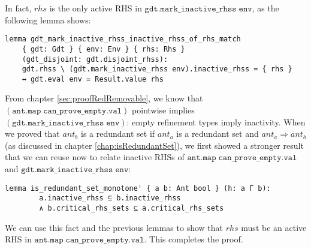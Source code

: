 In fact, $\mathit{rhs}$ is the only active RHS in $\mathtt{gdt.mark\_inactive\_rhss\;env}$, as the following lemma shows:

\begin{verbatim}
lemma gdt_mark_inactive_rhss_inactive_rhss_of_rhs_match
    { gdt: Gdt } { env: Env } { rhs: Rhs }
    (gdt_disjoint: gdt.disjoint_rhss):
    gdt.rhss \ (gdt.mark_inactive_rhss env).inactive_rhss = { rhs }
    ↔ gdt.eval env = Result.value rhs
\end{verbatim}

From chapter \ref{sec:proofRedRemovable}, we know that $(\mathtt{ant.map\;can\_prove\_empty.val})$ pointwise implies $(\mathtt{gdt.mark\_inactive\_rhss\;env})$:
empty refinement types imply inactivity.
When we proved that $\mathit{ant}_b$ is a redundant set if $\mathit{ant}_a$ is a redundant set and $\mathit{ant}_a \Rightarrow \mathit{ant}_b$ (as discussed in chapter \ref{chap:isRedundantSet}),
we first showed a stronger result that we can reuse now to relate inactive RHSs of $\mathtt{ant.map\;can\_prove\_empty.val}$ and $\mathtt{gdt.mark\_inactive\_rhss\;env}$:
\begin{verbatim}
lemma is_redundant_set_monotone' { a b: Ant bool } (h: a Γ b): 
        a.inactive_rhss ⊆ b.inactive_rhss
        ∧ b.critical_rhs_sets ⊆ a.critical_rhs_sets
\end{verbatim}

We can use this fact and the previous lemmas to show that $\mathit{rhs}$ must be an active RHS in $\mathtt{ant.map\;can\_prove\_empty.val}$.
This completes the proof.